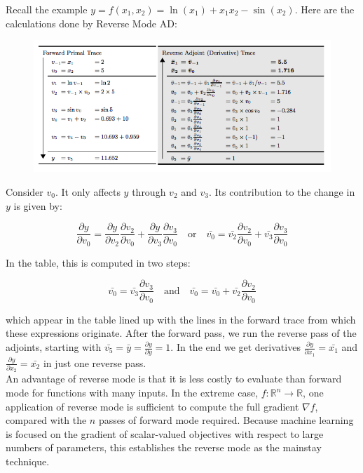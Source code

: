 \documentclass[11pt]{article}
\theoremstyle{definition}
\theoremstyle{plain}
\renewcommand{\b}[1]{\mathbb{#1}}
\begin{document}
\noindent Recall the example $y = f(x_1,x_2) = \ln(x_1) + x_1 x_2 - \sin(x_2)$.
Here are the calculations done by Reverse Mode AD:

\begin{figure}[H]
\includegraphics[width=14cm]{reverse}
\centering
\end{figure}

\noindent Consider $v_0$. It only affects $y$ through $v_2$ and $v_3$. Its
contribution to the change in $y$ is given by:

$$ \frac{\partial y}{\partial v_0} = \frac{\partial y}{\partial v_2} 
                                     \frac{\partial v_2}{\partial v_0} 
                                    +
                                     \frac{\partial y}{\partial v_3}
                                     \frac{\partial v_3}{\partial v_0}
\quad \text{or} \quad
\bar{v_0} = \bar{v_2} \frac{\partial v_2}{\partial v_0} 
             + \bar{v_3} \frac{\partial v_3}{\partial v_0} $$

\noindent In the table, this is computed in two steps:


$$ \bar{v_0} = \bar{v_3} \frac{\partial v_3}{\partial v_0} \quad \text{and} \quad
   \bar{v_0} = \bar{v_0} + \bar{v_2} \frac{\partial v_2}{\partial v_0} $$

\noindent which appear in the table lined up with the lines in the forward trace
from which these expressions originate. After the forward pass, we run
the reverse pass of the adjoints, starting with $\bar{v_5} = \bar{y} =
\frac{\partial y}{\partial y} = 1$. In the end we get derivatives
$\frac{\partial y}{\partial x_1} = \bar{x_1}$ and $\frac{\partial y}{\partial x_2} =
\bar{x_2}$ in just one reverse pass.\\

\noindent An advantage of reverse mode is that it is less costly to evaluate
than forward mode for functions with many inputs. In the extreme case,
$f: \b{R}^n \rightarrow \b{R}$, one application of reverse mode is sufficient
to compute the full gradient $\nabla f$, compared with the $n$ passes of
forward mode required. Because machine learning is focused on the
gradient of scalar-valued objectives with respect to large numbers of
parameters, this establishes the reverse mode as the mainstay technique.
\end{document}
